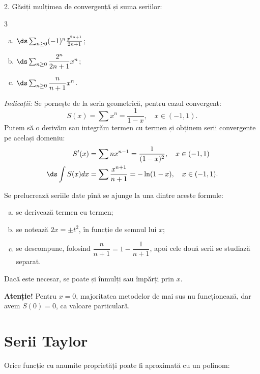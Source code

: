 \vspace{0.5cm}

2. Găsiți mulțimea de convergență și suma seriilor:
\begin{multicols}{3}
    \begin{enumerate}[(a)]
        \item $ \ds\sum_{n \geq 0} (-1)^n \frac{x^{2n+1}}{2n + 1} $;
        \item $ \ds\sum_{n \geq 0} \dfrac{2^n}{2n + 1} x^n $;
        \item $ \ds\sum_{n \geq 0} \dfrac{n}{n + 1} x^n $.
    \end{enumerate}
\end{multicols}

\emph{Indicații:} Se pornește de la seria geometrică, pentru cazul
convergent:
\[
    S(x) = \sum x^n = \dfrac{1}{1 - x}, \quad x \in (-1, 1).
\]
Putem să o derivăm sau integrăm termen cu termen și obținem serii
convergente pe același domeniu:
\begin{align*}
    S'(x) &= \sum nx^{n-1} = \dfrac{1}{(1 - x)^2}, \quad x \in (-1, 1) \\
    \ds\int S(x) dx &= \sum \dfrac{x^{n+1}}{n + 1} = - \ln(1 - x), \quad x \in (-1, 1).
\end{align*}

Se prelucrează seriile date pînă se ajunge la una dintre aceste formule:
\begin{enumerate}[(a)]
    \item se derivează termen cu termen;
    \item se notează $ 2x = \pm t^2 $, în funcție de semnul lui $ x $;
    \item se descompune, folosind $ \dfrac{n}{n + 1} = 1 - \dfrac{1}{n + 1} $,
        apoi cele două serii se studiază separat.
\end{enumerate}

Dacă este necesar, se poate și înmulți sau împărți prin $ x $.

\textbf{Atenție!} Pentru $ x = 0$, majoritatea metodelor de mai sus nu
funcționează, dar avem $ S(0) = 0 $, ca valoare particulară.

\section{Serii Taylor}

Orice funcție cu anumite proprietăți poate fi aproximată cu un polinom:

